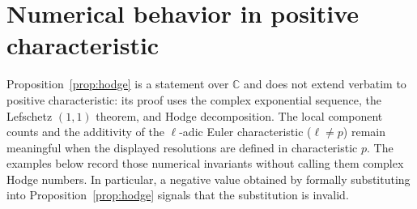 \documentclass[a4paper]{amsart}
\theoremstyle{plain}
\theoremstyle{definition}
\theoremstyle{remark}
\numberwithin{equation}{section}
\newcommand{\CC}{\mathbb{C}}
\begin{document}
\section{Numerical behavior in positive characteristic}
\label{sec6}

Proposition~\ref{prop:hodge} is a statement over $\CC$ and does not
extend verbatim to positive characteristic: its proof uses the complex
exponential sequence, the Lefschetz $(1,1)$ theorem, and Hodge
decomposition.  The local component counts and the additivity of the
$\ell$-adic Euler characteristic ($\ell\ne p$) remain meaningful when the
displayed resolutions are defined in characteristic $p$.  The examples
below record those numerical invariants without calling them complex
Hodge numbers.  In particular, a negative value obtained by formally
substituting into Proposition~\ref{prop:hodge} signals that the
substitution is invalid.
\end{document}
